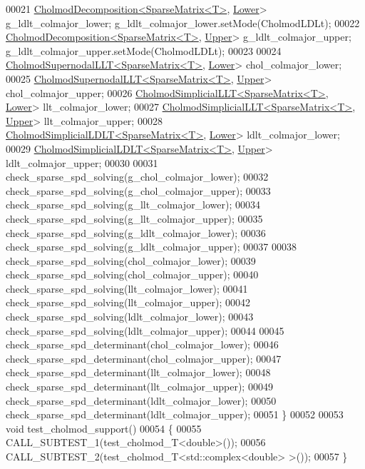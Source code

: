 \begin{DoxyCode}
00021   \hyperlink{class_eigen_1_1_cholmod_decomposition}{CholmodDecomposition<SparseMatrix<T>}, 
      \hyperlink{group__enums_gga39e3366ff5554d731e7dc8bb642f83cda891792b8ed394f7607ab16dd716f60e6}{Lower}> g\_ldlt\_colmajor\_lower; g\_ldlt\_colmajor\_lower.setMode(CholmodLDLt);
00022   \hyperlink{class_eigen_1_1_cholmod_decomposition}{CholmodDecomposition<SparseMatrix<T>}, 
      \hyperlink{group__enums_gga39e3366ff5554d731e7dc8bb642f83cda6bcb58be3b8b8ec84859ce0c5ac0aaec}{Upper}> g\_ldlt\_colmajor\_upper; g\_ldlt\_colmajor\_upper.setMode(CholmodLDLt);
00023   
00024   \hyperlink{class_eigen_1_1_cholmod_supernodal_l_l_t}{CholmodSupernodalLLT<SparseMatrix<T>}, 
      \hyperlink{group__enums_gga39e3366ff5554d731e7dc8bb642f83cda891792b8ed394f7607ab16dd716f60e6}{Lower}> chol\_colmajor\_lower;
00025   \hyperlink{class_eigen_1_1_cholmod_supernodal_l_l_t}{CholmodSupernodalLLT<SparseMatrix<T>}, 
      \hyperlink{group__enums_gga39e3366ff5554d731e7dc8bb642f83cda6bcb58be3b8b8ec84859ce0c5ac0aaec}{Upper}> chol\_colmajor\_upper;
00026   \hyperlink{class_eigen_1_1_cholmod_simplicial_l_l_t}{CholmodSimplicialLLT<SparseMatrix<T>}, 
      \hyperlink{group__enums_gga39e3366ff5554d731e7dc8bb642f83cda891792b8ed394f7607ab16dd716f60e6}{Lower}> llt\_colmajor\_lower;
00027   \hyperlink{class_eigen_1_1_cholmod_simplicial_l_l_t}{CholmodSimplicialLLT<SparseMatrix<T>}, 
      \hyperlink{group__enums_gga39e3366ff5554d731e7dc8bb642f83cda6bcb58be3b8b8ec84859ce0c5ac0aaec}{Upper}> llt\_colmajor\_upper;
00028   \hyperlink{class_eigen_1_1_cholmod_simplicial_l_d_l_t}{CholmodSimplicialLDLT<SparseMatrix<T>}, 
      \hyperlink{group__enums_gga39e3366ff5554d731e7dc8bb642f83cda891792b8ed394f7607ab16dd716f60e6}{Lower}> ldlt\_colmajor\_lower;
00029   \hyperlink{class_eigen_1_1_cholmod_simplicial_l_d_l_t}{CholmodSimplicialLDLT<SparseMatrix<T>}, 
      \hyperlink{group__enums_gga39e3366ff5554d731e7dc8bb642f83cda6bcb58be3b8b8ec84859ce0c5ac0aaec}{Upper}> ldlt\_colmajor\_upper;
00030 
00031   check\_sparse\_spd\_solving(g\_chol\_colmajor\_lower);
00032   check\_sparse\_spd\_solving(g\_chol\_colmajor\_upper);
00033   check\_sparse\_spd\_solving(g\_llt\_colmajor\_lower);
00034   check\_sparse\_spd\_solving(g\_llt\_colmajor\_upper);
00035   check\_sparse\_spd\_solving(g\_ldlt\_colmajor\_lower);
00036   check\_sparse\_spd\_solving(g\_ldlt\_colmajor\_upper);
00037   
00038   check\_sparse\_spd\_solving(chol\_colmajor\_lower);
00039   check\_sparse\_spd\_solving(chol\_colmajor\_upper);
00040   check\_sparse\_spd\_solving(llt\_colmajor\_lower);
00041   check\_sparse\_spd\_solving(llt\_colmajor\_upper);
00042   check\_sparse\_spd\_solving(ldlt\_colmajor\_lower);
00043   check\_sparse\_spd\_solving(ldlt\_colmajor\_upper);
00044 
00045   check\_sparse\_spd\_determinant(chol\_colmajor\_lower);
00046   check\_sparse\_spd\_determinant(chol\_colmajor\_upper);
00047   check\_sparse\_spd\_determinant(llt\_colmajor\_lower);
00048   check\_sparse\_spd\_determinant(llt\_colmajor\_upper);
00049   check\_sparse\_spd\_determinant(ldlt\_colmajor\_lower);
00050   check\_sparse\_spd\_determinant(ldlt\_colmajor\_upper);
00051 \}
00052 
00053 \textcolor{keywordtype}{void} test\_cholmod\_support()
00054 \{
00055   CALL\_SUBTEST\_1(test\_cholmod\_T<double>());
00056   CALL\_SUBTEST\_2(test\_cholmod\_T<std::complex<double> >());
00057 \}
\end{DoxyCode}
